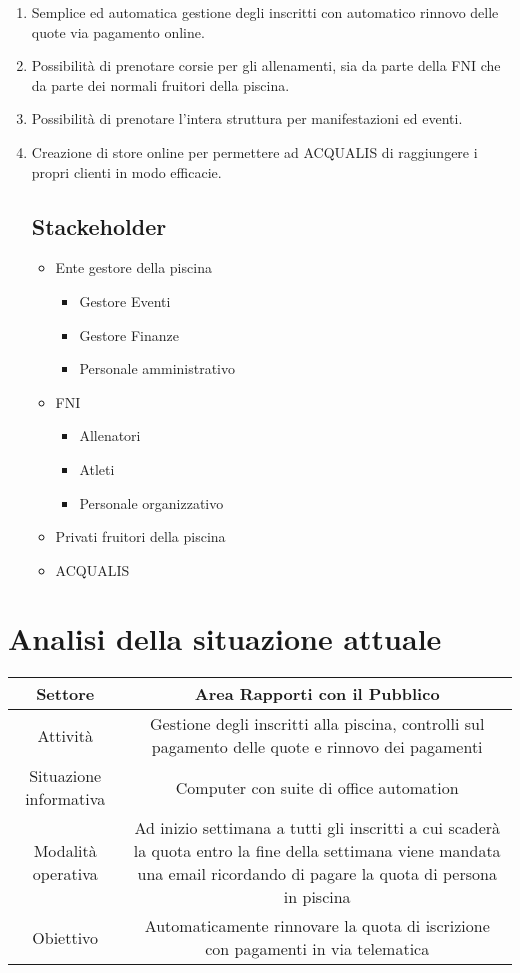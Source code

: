 \documentclass[11pt]{article} %
\newcommand{\AnalisiSituazioneAttualeTabella}[5]{
	\begin{tabulary}{\textwidth}{|C|C|}
		\hline
		Settore & #1 \\ \hline
		Attività & #2 \\ \hline
		Situazione informativa & #3 \\ \hline
		Modalità operativa & #4 \\ \hline
		Obiettivo & #5 \\
		\hline
	\end{tabulary}
}
\begin{document}
\begin{enumerate}
	\item Semplice ed automatica gestione degli inscritti con automatico rinnovo delle quote via pagamento online.  

	\item Possibilità di prenotare corsie per gli allenamenti, sia da parte della FNI che da parte dei normali fruitori della piscina.

	\item Possibilità di prenotare l'intera struttura per manifestazioni ed eventi.

	\item Creazione di store online per permettere ad ACQUALIS di raggiungere i propri clienti in modo efficacie.

\subsection{Stackeholder}

\begin{itemize}
	\item Ente gestore della piscina
	\begin{itemize}
		\item Gestore Eventi
		\item Gestore Finanze
		\item Personale amministrativo
	\end{itemize}
	\item FNI
	\begin{itemize}
		\item Allenatori
		\item Atleti
		\item Personale organizzativo
	\end{itemize}
	\item Privati fruitori della piscina
	\item ACQUALIS
\end{itemize}

\end{enumerate}

\section{Analisi della situazione attuale}

\AnalisiSituazioneAttualeTabella
	{Area Rapporti con il Pubblico}
	{Gestione degli inscritti alla piscina, controlli sul pagamento delle quote e rinnovo dei pagamenti}
	{Computer con suite di office automation}
	{Ad inizio settimana a tutti gli inscritti a cui scaderà la quota entro la fine della settimana viene mandata una email ricordando di pagare la quota di persona in piscina}
	{Automaticamente rinnovare la quota di iscrizione con pagamenti in via telematica}
\end{document}

